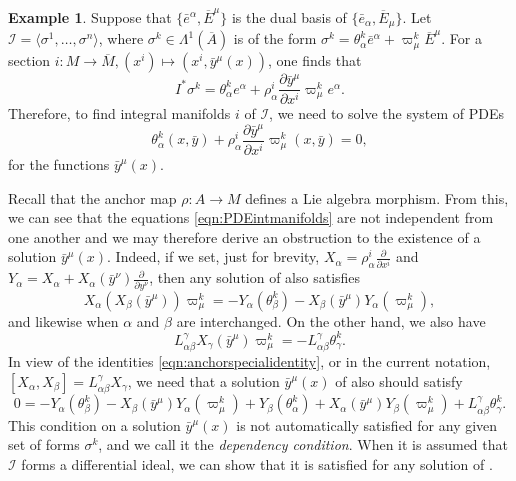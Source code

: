 \documentclass[11pt]{article}
\theoremstyle{plain}
\theoremstyle{definition}
\newtheorem{example}{Example}
\begin{document}
\begin{example}\label{eg:oneforms}
Suppose that $\{\bar{e}^{\alpha},\overline{E}^{\mu}\}$ is the dual basis of $\{\bar{e}_{\alpha},\overline{E}_{\mu}\}$. Let $\mathcal{I}=\langle \sigma^1,\dots,\sigma^n\rangle$, where $\sigma^k\in \Lambda^1(\overline{A})$ is of the form $\sigma^k=\theta_{\alpha}^k \bar{e}^{\alpha}+\varpi_{\mu}^k \overline{E}^{\mu}$. For a section $i\colon M\to \overline M, (x^i) \mapsto (x^i, \bar{y}^\mu(x))$, one finds that
\begin{equation*}
    I^{\ast}\sigma^k=\theta_{\alpha}^k e^{\alpha}+\rho_{\alpha}^i\frac{\partial \bar{y}^{\mu}}{\partial x^i}\varpi_{\mu}^k e^{\alpha}.
\end{equation*}
Therefore, to find integral manifolds $i$ of $\mathcal{I}$, we need to solve the system of PDEs
\begin{equation}\label{eqn:PDEintmanifolds}
    \theta_{\alpha}^k(x,\bar{y})+\rho_{\alpha}^i \frac{\partial \bar{y}^{\mu}}{\partial x^i}\varpi_{\mu}^k(x,\bar{y})=0,
\end{equation}
for the functions $\bar{y}^{\mu}(x)$. 

Recall that the anchor map $\rho\colon A \to M$ defines a Lie algebra morphism. From this, we can see that the equations \eqref{eqn:PDEintmanifolds} are not independent from one another and we may therefore derive an obstruction to the existence of a solution ${\bar y}^\mu(x)$. Indeed, if we set, just for brevity, $X_\alpha = \rho^i_\alpha \frac{\partial}{\partial x^i}$ and $Y_\alpha=X_\alpha+ X_\alpha({\bar y}^\nu)\frac{\partial }{\partial y^\nu}$, then any solution of  also satisfies
\begin{equation*}
    X_\alpha (X_\beta (\bar{y}^\mu))\varpi^k_\mu = - {Y}_\alpha(\theta^k_\beta) - X_\beta(\bar{y}^\mu){Y}_\alpha(\varpi^k_\mu),
\end{equation*}
and likewise when $\alpha$ and $\beta$ are interchanged.  On the other hand, we also have
\begin{equation*}
    L_{\alpha\beta}^\gamma X_\gamma({\bar y}^\mu)\varpi^k_\mu = - L_{\alpha\beta}^\gamma \theta^k_\gamma.
\end{equation*}
In view of the identities \eqref{eqn:anchorspecialidentity}, or in the current notation, $[X_\alpha,X_\beta] = L_{\alpha\beta}^\gamma X_\gamma$, we need that a solution ${\bar y}^\mu(x)$ of  also should satisfy
\begin{equation} \label{eq:integ}
0= - Y_\alpha(\theta^k_\beta) - X_\beta(\bar{y}^\mu)Y_\alpha(\varpi^k_\mu) +  Y_\beta(\theta^k_\alpha) + X_\alpha(\bar{y}^\mu)Y_\beta(\varpi^k_\mu) +  L_{\alpha\beta}^\gamma \theta^k_\gamma. 
\end{equation}
This condition on a solution ${\bar y}^\mu(x)$ is not automatically satisfied for any given set of forms $\sigma^k$, and we call it the \emph{dependency condition}. 
When it is assumed that $\mathcal{I}$ forms a differential ideal, we can show that it is satisfied for any solution of .



\end{example}
\end{document}
